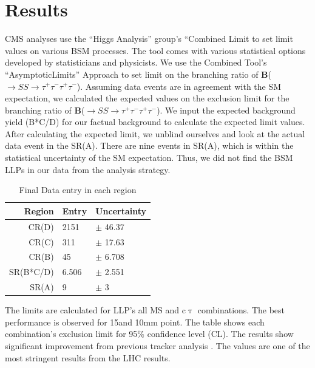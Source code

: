 \clearpage
\chapter{Results}\label{sec:results}
CMS analyses use the ``Higgs Analysis'' group's ``Combined Limit to set limit values on various BSM processes.
The tool comes with various statistical options developed by statisticians and physicists.
We use the Combined Tool's ``AsymptoticLimits'' Approach to set limit on the branching ratio of \textbf{B}(\PH$\to SS \to \tau^{+}\tau^{-}\tau^{+}\tau^{-}$).
Assuming data events are in agreement with the SM expectation, we calculated the expected values on the exclusion limit for the branching ratio of \textbf{B}(\PH$\to SS \to \tau^{+}\tau^{-}\tau^{+}\tau^{-}$).
We input the expected background yield (B*C/D) for our factual background to calculate the expected limit values.
After calculating the expected limit, we unblind ourselves and look at the actual data event in the SR(A).
There are nine events in SR(A), which is within the statistical uncertainty of the SM expectation.
Thus, we did not find the BSM LLPs in our data from the analysis strategy.
\begin{table}[htb]
\caption{Final Data entry in each region}
\begin{center}
\begin{tabular}{r|l|l}\hline
	Region & Entry & Uncertainty \\
 \hline
	CR(D) & 2151 & $\pm$ 46.37 \\
 \hline
	CR(C) & 311 & $\pm$ 17.63\\
 \hline
	CR(B) & 45 & $\pm$ 6.708\\
 \hline
	SR(B*C/D) & 6.506 & $\pm$ 2.551\\
 \hline
	SR(A) & 9 & $\pm$ 3 \\
 \hline
\end{tabular}
\label{tab:unblind}
\end{center}
\end{table}

The limits are calculated for LLP's all MS and c$\uptau$ combinations.
The best performance is observed for 15\GeV and 10mm point.
The table shows each combination's exclusion limit for 95\% confidence level (CL).
The results show significant improvement from previous tracker analysis \cite{ZHAN}.
The values are one of the most stringent results from the LHC results.

